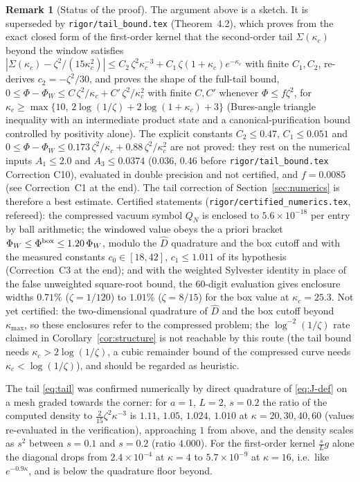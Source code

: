 \documentclass[11pt]{article}
\theoremstyle{accent}
\theoremstyle{definition}
\newtheorem{remark}[theorem]{Remark}
\begin{document}
\begin{remark}[Status of the proof]The argument above is a sketch.  It is superseded by \texttt{rigor/tail\_bound.tex} (Theorem~4.2), which proves from the exact closed form of the first-order kernel that the second-order tail \(\Sigma(\kappa_c)\) beyond the window satisfies \(|\Sigma(\kappa_c)-\zeta^2/(15\kappa_c^2)|\le C_2\,\zeta^2\kappa_c^{-3}+C_1\,\zeta(1+\kappa_c)e^{-\kappa_c}\) with finite \(C_1,C_2\), re-derives \(c_2=-\zeta^2/30\), and proves the shape of the full-tail bound, \(0\le\Phi-\Phi_W\le C\,\zeta^2/\kappa_c+C'\,\zeta^2/\kappa_c^2\) with finite \(C,C'\) whenever \(\Phi\le f\zeta^2\), for \(\kappa_c\ge\max\{10,\,2\log(1/\zeta)+2\log(1+\kappa_c)+3\}\) (Bures-angle triangle inequality with an intermediate product state and a canonical-purification bound controlled by positivity alone).  The explicit constants \(C_2\le0.47\), \(C_1\le0.051\) and \(0\le\Phi-\Phi_W\le0.173\,\zeta^2/\kappa_c+0.88\,\zeta^2/\kappa_c^2\) are not proved: they rest on the numerical inputs \(A_1\le2.0\) and \(A_3\le0.0374\) (\(0.036\), \(0.46\) before \texttt{rigor/tail\_bound.tex} Correction C10), evaluated in double precision and not certified, and \(f=0.0085\) (see Correction~C1 at the end).  The tail correction of Section~\ref{sec:numerics} is therefore a best estimate.  Certified statements (\texttt{rigor/certified\_numerics.tex}, refereed): the compressed vacuum symbol \(Q_N\) is enclosed to \(5.6\times10^{-18}\) per entry by ball arithmetic; the windowed value obeys the a priori bracket \(\Phi_W\le\Phi^{\rm box}\le1.20\,\Phi_W\), modulo the \(\widehat D\) quadrature and the box cutoff and with the measured constants \(c_0\in[18,42]\), \(c_1\le1.011\) of its hypothesis (Correction~C3 at the end); and with the weighted Sylvester identity in place of the false unweighted square-root bound, the 60-digit evaluation gives enclosure widths \(0.71\%\) (\(\zeta=1/120\)) to \(1.01\%\) (\(\zeta=8/15\)) for the box value at \(\kappa_c=25.3\).  Not yet certified: the two-dimensional quadrature of \(\widehat D\) and the box cutoff beyond \(\kappa_{\max}\), so these enclosures refer to the compressed problem; the \(\log^{-2}(1/\zeta)\) rate claimed in Corollary~\ref{cor:structure} is not reachable by this route (the tail bound needs \(\kappa_c>2\log(1/\zeta)\), a cubic remainder bound of the compressed curve needs \(\kappa_c<\log(1/\zeta)\)), and should be regarded as heuristic.\end{remark}

The tail \eqref{eq:tail} was confirmed numerically by direct quadrature of \eqref{eq:J-def} on a mesh graded towards the corner: for \(a=1\), \(L=2\), \(s=0.2\) the ratio of the computed density to \(\frac2{15}\zeta^2\kappa^{-3}\) is \(1.11,\,1.05,\,1.024,\,1.010\) at \(\kappa=20,30,40,60\) (values re-evaluated in the verification), approaching \(1\) from above, and the density scales as \(s^2\) between \(s=0.1\) and \(s=0.2\) (ratio \(4.000\)).  For the first-order kernel \(\frac sLg\) alone the diagonal drops from \(2.4\times10^{-4}\) at \(\kappa=4\) to \(5.7\times10^{-9}\) at \(\kappa=16\), i.e.\ like \(e^{-0.9\kappa}\), and is below the quadrature floor beyond.
\end{document}
